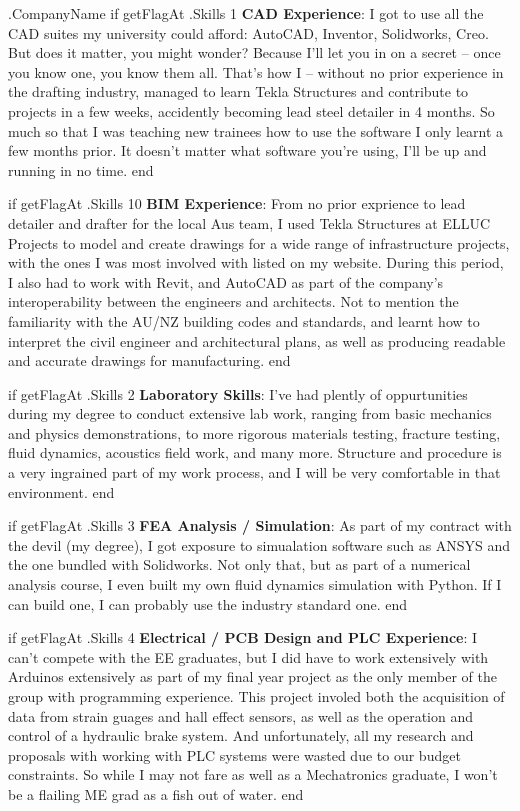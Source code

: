 \documentclass[10pt]{letter}
\begin{document}
\begin{letter}{
    {{ .CompanyName }}
}
{{ if getFlagAt .Skills 1 }}
\textbf{CAD Experience}: I got to use all the CAD suites my university could afford: AutoCAD, Inventor, Solidworks, Creo. But does it matter, you might wonder? Because I'll let you in on a secret -- once you know one, you know them all. That's how I -- without no prior experience in the drafting industry, managed to learn Tekla Structures and contribute to projects in a few weeks, accidently becoming lead steel detailer in 4 months. So much so that I was teaching new trainees how to use the software I only learnt a few months prior. It doesn't matter what software you're using, I'll be up and running in no time. 
{{ end }}

{{ if getFlagAt .Skills 10 }}
\textbf{BIM Experience}: From no prior exprience to lead detailer and drafter for the local Aus team, I used Tekla Structures at ELLUC Projects to model and create drawings for a wide range of infrastructure projects, with the ones I was most involved with listed on my website. During this period, I also had to work with Revit, and AutoCAD as part of the company's interoperability between the engineers and architects. Not to mention the familiarity with the AU/NZ building codes and standards, and learnt how to interpret the civil engineer and architectural plans, as well as producing readable and accurate drawings for manufacturing. 
{{ end }}

{{ if getFlagAt .Skills 2 }}
\textbf{Laboratory Skills}: I've had plently of oppurtunities during my degree to conduct extensive lab work, ranging from basic mechanics and physics demonstrations, to more rigorous materials testing, fracture testing, fluid dynamics, acoustics field work, and many more. Structure and procedure is a very ingrained part of my work process, and I will be very comfortable in that environment. 
{{ end }}

{{ if getFlagAt .Skills 3 }}
\textbf{FEA Analysis / Simulation}: As part of my contract with the devil (my degree), I got exposure to simualation software such as  ANSYS and the one bundled with Solidworks. Not only that, but as part of a numerical analysis course, I even built my own fluid dynamics simulation with Python. If I can build one, I can probably use the industry standard one. 
{{ end }}

{{ if getFlagAt .Skills 4 }}
\textbf{Electrical / PCB Design and PLC Experience}: I can't compete with the EE graduates, but I did have to work extensively with Arduinos extensively as part of my final year project as the only member of the group with programming experience. This project involed both the acquisition of data from strain guages and hall effect sensors, as well as the operation and control of a hydraulic brake system. And unfortunately, all my research and proposals with working with PLC systems were wasted due to our budget constraints. So while I may not fare as well as a Mechatronics graduate, I won't be a flailing ME grad as a fish out of water. 
{{ end }}


\end{letter}
\end{document}
